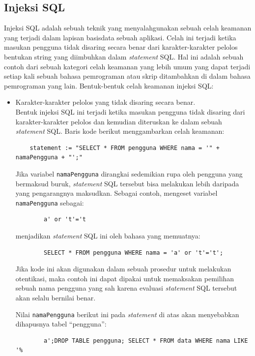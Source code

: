 \subsection{Injeksi SQL}
Injeksi SQL \cite{injeksi-sql} adalah sebuah teknik yang menyalahgunakan sebuah celah keamanan yang terjadi dalam lapisan basisdata sebuah aplikasi. Celah ini terjadi ketika masukan pengguna tidak disaring secara benar dari karakter-karakter pelolos bentukan string yang diimbuhkan dalam \textit{statement} SQL. Hal ini adalah sebuah contoh dari sebuah kategori celah keamanan yang lebih umum yang dapat terjadi setiap kali sebuah bahasa pemrograman atau skrip ditambahkan di dalam bahasa pemrograman yang lain. Bentuk-bentuk celah keamanan injeksi SQL:
\begin{itemize}
	\item Karakter-karakter pelolos yang tidak disaring secara benar.\\
	Bentuk injeksi SQL ini terjadi ketika masukan pengguna tidak disaring dari karakter-karakter pelolos dan kemudian diteruskan ke dalam sebuah \textit{statement} SQL. Baris kode berikut menggambarkan celah keamanan:
	\begin{lstlisting}
	statement := "SELECT * FROM pengguna WHERE nama = '" + namaPengguna + "';"
\end{lstlisting}
	
	Jika variabel \verb!namaPengguna! dirangkai sedemikian rupa oleh pengguna yang bermaksud buruk, \textit{statement} SQL tersebut bisa melakukan lebih daripada yang pengarangnya maksudkan. Sebagai contoh, mengeset variabel \verb!namaPengguna! sebagai:
	\begin{lstlisting}
		a' or 't'='t
	\end{lstlisting}
	menjadikan \textit{statement} SQL ini oleh bahasa yang memuatnya:
	\begin{lstlisting}
		SELECT * FROM pengguna WHERE nama = 'a' or 't'='t';
	\end{lstlisting}
	Jika kode ini akan digunakan dalam sebuah prosedur untuk melakukan otentikasi, maka contoh ini dapat dipakai untuk memaksakan pemilihan sebuah nama pengguna yang sah karena evaluasi \textit{statement} SQL tersebut akan selalu bernilai benar.
	
	 Nilai \verb!namaPengguna! berikut ini pada \textit{statement} di atas akan menyebabkan dihapusnya tabel ``pengguna'':
	 
	\begin{lstlisting}
		a';DROP TABLE pengguna; SELECT * FROM data WHERE nama LIKE '%
	\end{lstlisting}
	

\end{itemize}
